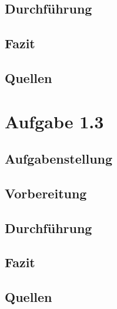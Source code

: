 	\subsection{Durchführung}
	\subsection{Fazit}
	\subsection{Quellen}
\section{Aufgabe 1.3}
\subsection{Aufgabenstellung}
\subsection{Vorbereitung}
\subsection{Durchführung}
\subsection{Fazit}
\subsection{Quellen}